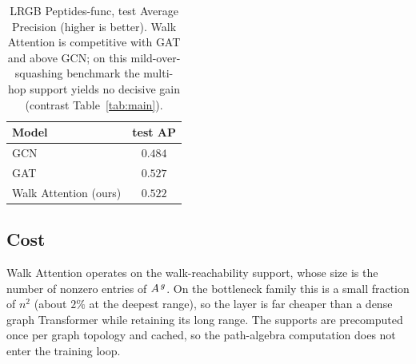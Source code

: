 \begin{table}[t]
\centering
\caption{LRGB Peptides-func, test Average Precision (higher is better). Walk
Attention is competitive with GAT and above GCN; on this mild-over-squashing
benchmark the multi-hop support yields no decisive gain (contrast
Table~\ref{tab:main}).}
\label{tab:lrgb}
\begin{tabular}{lc}
\toprule
\textbf{Model} & \textbf{test AP} \\
\midrule
GCN                          & $0.484$ \\
GAT                          & $\mathbf{0.527}$ \\
Walk Attention (ours)        & $0.522$ \\
\bottomrule
\end{tabular}
\end{table}

\subsection{Cost}

Walk Attention operates on the walk-reachability support, whose size is the
number of nonzero entries of $A^{\,g}$. On the bottleneck family this is a
small fraction of $n^2$ (about $2\%$ at the deepest range), so the layer is far
cheaper than a dense graph Transformer while retaining its long range. The
supports are precomputed once per graph topology and cached, so the path-algebra
computation does not enter the training loop.
